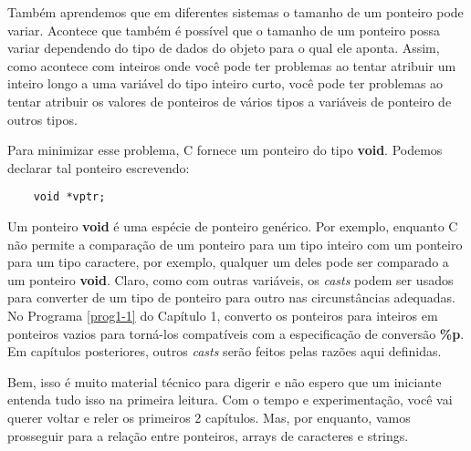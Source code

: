 Também aprendemos que em diferentes sistemas o tamanho de um ponteiro pode variar. Acontece que também é possível que o tamanho de um ponteiro possa variar dependendo do tipo de dados do objeto para o qual ele aponta. Assim, como acontece com inteiros onde você pode ter problemas ao tentar atribuir um inteiro longo a uma variável do tipo inteiro curto, você pode ter problemas ao tentar atribuir os valores de ponteiros de vários tipos a variáveis de ponteiro de outros tipos.

Para minimizar esse problema, C fornece um ponteiro do tipo \textbf{void}. Podemos declarar tal ponteiro escrevendo:
\begin{lstlisting}
	void *vptr;
\end{lstlisting}

Um ponteiro \textbf{void} é uma espécie de ponteiro genérico. Por exemplo, enquanto C não permite a comparação de um ponteiro para um tipo inteiro com um ponteiro para um tipo caractere, por exemplo, qualquer um deles pode ser comparado a um ponteiro \textbf{void}. Claro, como com outras variáveis, os \textit{casts} podem ser usados para converter de um tipo de ponteiro para outro nas circunstâncias adequadas. No Programa \ref{prog1-1} do Capítulo 1, converto os ponteiros para inteiros em ponteiros vazios para torná-los compatíveis com a especificação de conversão \textbf{\%p}. Em capítulos posteriores, outros \textit{casts} serão feitos pelas razões aqui definidas.

Bem, isso é muito material técnico para digerir e não espero que um iniciante entenda tudo isso na primeira leitura. Com o tempo e experimentação, você vai querer voltar e reler os primeiros 2 capítulos. Mas, por enquanto, vamos prosseguir para a relação entre ponteiros, arrays de caracteres e strings.

